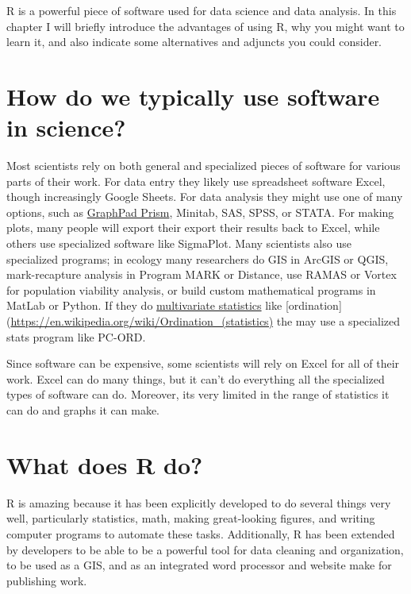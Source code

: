 \documentclass[
]{book}
\begin{document}
R is a powerful piece of software used for data science and data analysis. In this chapter I will briefly introduce the advantages of using R, why you might want to learn it, and also indicate some alternatives and adjuncts you could consider.

\hypertarget{how-do-we-typically-use-software-in-science}{%
\section{How do we typically use software in science?}\label{how-do-we-typically-use-software-in-science}}

Most scientists rely on both general and specialized pieces of software for various parts of their work. For data entry they likely use spreadsheet software Excel, though increasingly Google Sheets. For data analysis they might use one of many options, such as \href{https://www.graphpad.com/}{GraphPad Prism}, Minitab, SAS, SPSS, or STATA. For making plots, many people will export their export their results back to Excel, while others use specialized software like SigmaPlot. Many scientists also use specialized programs; in ecology many researchers do GIS in ArcGIS or QGIS, mark-recapture analysis in Program MARK or Distance, use RAMAS or Vortex for population viability analysis, or build custom mathematical programs in MatLab or Python. If they do \href{https://en.wikipedia.org/wiki/Multivariate_statistics}{multivariate statistics} like {[}ordination{]}(\url{https://en.wikipedia.org/wiki/Ordination_(statistics)} the may use a specialized stats program like PC-ORD.

Since software can be expensive, some scientists will rely on Excel for all of their work. Excel can do many things, but it can't do everything all the specialized types of software can do. Moreover, its very limited in the range of statistics it can do and graphs it can make.

\hypertarget{what-does-r-do}{%
\section{What does R do?}\label{what-does-r-do}}

R is amazing because it has been explicitly developed to do several things very well, particularly statistics, math, making great-looking figures, and writing computer programs to automate these tasks. Additionally, R has been extended by developers to be able to be a powerful tool for data cleaning and organization, to be used as a GIS, and as an integrated word processor and website make for publishing work.
\end{document}
